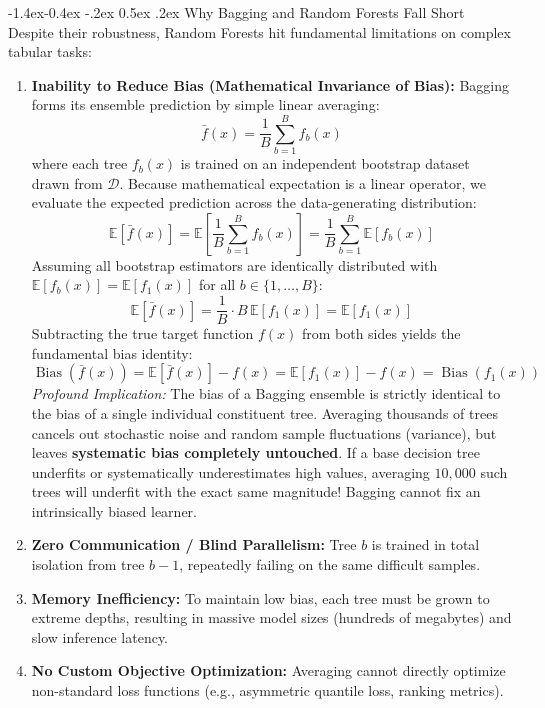 \documentclass[11pt,a4paper]{article}
\makeatletter
\renewcommand\subsection{\@startsection{subsection}{2}{\z@}%
                                     {-1.4ex\@plus -0.4ex \@minus -.2ex}%
                                     {0.5ex \@plus .2ex}%
                                     {\normalfont\normalsize\bfseries}}
\newcommand{\E}{\mathbb{E}}
\makeatother
\begin{document}
\subsection{Why Bagging and Random Forests Fall Short}
Despite their robustness, Random Forests hit fundamental limitations on complex tabular tasks:
\begin{enumerate}
    \item \textbf{Inability to Reduce Bias (Mathematical Invariance of Bias):}
    Bagging forms its ensemble prediction by simple linear averaging:
    \begin{equation}
        \bar{f}(x) = \frac{1}{B} \sum_{b=1}^B f_b(x)
    \end{equation}
    where each tree $f_b(x)$ is trained on an independent bootstrap dataset drawn from $\mathcal{D}$.
    Because mathematical expectation is a linear operator, we evaluate the expected prediction across the data-generating distribution:
    \begin{equation}
        \E[\bar{f}(x)] = \E\left[ \frac{1}{B} \sum_{b=1}^B f_b(x) \right] = \frac{1}{B} \sum_{b=1}^B \E[f_b(x)]
    \end{equation}
    Assuming all bootstrap estimators are identically distributed with $\E[f_b(x)] = \E[f_1(x)]$ for all $b \in \{1, \dots, B\}$:
    \begin{equation}
        \E[\bar{f}(x)] = \frac{1}{B} \cdot B \, \E[f_1(x)] = \E[f_1(x)]
    \end{equation}
    Subtracting the true target function $f(x)$ from both sides yields the fundamental bias identity:
    \begin{equation}
        \operatorname{Bias}(\bar{f}(x)) = \E[\bar{f}(x)] - f(x) = \E[f_1(x)] - f(x) = \operatorname{Bias}(f_1(x))
    \end{equation}
    \emph{Profound Implication:} The bias of a Bagging ensemble is strictly identical to the bias of a single individual constituent tree. Averaging thousands of trees cancels out stochastic noise and random sample fluctuations (variance), but leaves \textbf{systematic bias completely untouched}. If a base decision tree underfits or systematically underestimates high values, averaging $10{,}000$ such trees will underfit with the exact same magnitude! Bagging cannot fix an intrinsically biased learner.
    \item \textbf{Zero Communication / Blind Parallelism:} Tree $b$ is trained in total isolation from tree $b-1$, repeatedly failing on the same difficult samples.
    \item \textbf{Memory Inefficiency:} To maintain low bias, each tree must be grown to extreme depths, resulting in massive model sizes (hundreds of megabytes) and slow inference latency.
    \item \textbf{No Custom Objective Optimization:} Averaging cannot directly optimize non-standard loss functions (e.g., asymmetric quantile loss, ranking metrics).
\end{enumerate}
\end{document}
